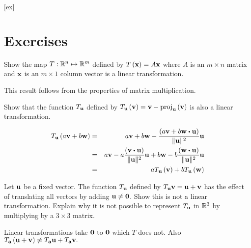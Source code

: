 [ex]
\section*{Exercises}

\begin{enumialphparenastyle}

\begin{ex} Show the map $T:\mathbb{R}^{n}\mapsto \mathbb{R}^{m}$ defined by 
$T\left( {\bf x} \right) =A{\bf x}$ where $A$ is an $m\times n$ matrix
and ${\bf x}$ is an $m\times 1$ column vector is a linear transformation. 
\begin{sol}
This result follows from the properties of matrix multiplication.
\end{sol}
\end{ex}

\begin{ex} Show that the function $T_{{\bf u}}$ defined by $T_{{\bf u}}
\left( {\bf v}\right) = {\bf v}-\mbox{proj}_{{\bf u}}\left(
{\bf v}\right) $ is also a linear transformation.
\begin{sol}
\begin{eqnarray*}
T_{\vect{u}}\left( a\vect{v}+b\vect{w}\right) &=&a\vect{v}+b\vect{w}-\frac{\left( a\vect{v}+b\vect{w}\dotprod \vect{u}\right) }{\vectlength \vect{u}
\vectlength ^{2}}\vect{u} \\
&=&a\vect{v}-a\frac{\left( \vect{v}\dotprod \vect{u}\right) }{\vectlength \vect{u} \vectlength ^{2}}\vect{u}+b\vect{w}-b\frac{\left( \vect{w}\dotprod \vect{u}
\right) }{\vectlength \vect{u}\vectlength ^{2}}\vect{u} \\
&=&aT_{\vect{u}}\left( \vect{v}\right) +bT_{\vect{u}}\left( \vect{w}
\right)
\end{eqnarray*}
\end{sol}
\end{ex}

\begin{ex} Let ${\bf u}$ be a fixed vector. The function 
$T_{{\bf u}}$ defined by $T_{{\bf u}}{\bf v}={\bf u}+{\bf v}$ has the effect of
translating all vectors by adding ${\bf u}\neq {\bf 0}$. Show this is not a
linear transformation. Explain why it is not possible to represent 
$T_{{\bf u}}$ in $\mathbb{R}^{3}$ by multiplying by a $3\times 3$ matrix.
\begin{sol}
Linear
transformations take ${\bf 0}$ to ${\bf 0}$ which $T$ does not. Also $T_{{\bf a}}\left( {\bf u}+{\bf v}\right) \neq T_{{\bf a}}{\bf u}+T_{{\bf a}}
{\bf v}.$
\end{sol}
\end{ex}

\end{enumialphparenastyle}